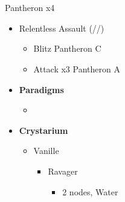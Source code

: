 \documentclass{report}
\begin{document}
\chapter{}

\renewcommand{\first}{[1] Relentless Assault (\com/\rav/\rav)}

\begin{battle}{Pantheron x4}
\begin{itemize}
    \item \first
    \begin{itemize}
        \item Blitz Pantheron C
        \item Attack x3 Pantheron A
    \end{itemize}
\end{itemize}
\end{battle}


\begin{menu}
\begin{itemize}
    \item \textbf{Paradigms}
    \begin{itemize}
        \item {}%
{\paradigmline{\rav}{\rav}{}}%
{\paradigmline{\syn}{\sab}{}}%
{\paradigmline{\rav}{\med}{}}%
{\paradigmline{\textit{\rav}}{\textit{[\sab]}}{}}%
{\paradigmline{[\rav]}{\rav}{}}
    \end{itemize}
    \item \textbf{Crystarium}
    \begin{itemize}
        \item Vanille
        \begin{itemize}
            \item Ravager
            \begin{itemize}
                \item 2 nodes, Water
            \end{itemize}
        \end{itemize}
    \end{itemize}
\end{itemize}
\end{menu}

\renewcommand{\first}{[1] Dualcasting (\rav/\rav)}
\renewcommand{\second}{[2] Tide Turner (\syn/\sab)}
\renewcommand{\third}{[3] Yin \& Yang (\rav/\med)}
\renewcommand{\fourth}{[4] Undermine (\rav/\sab)}
\renewcommand{\fifth}{[5] Dualcasting (\rav/\rav)}
\end{document}
